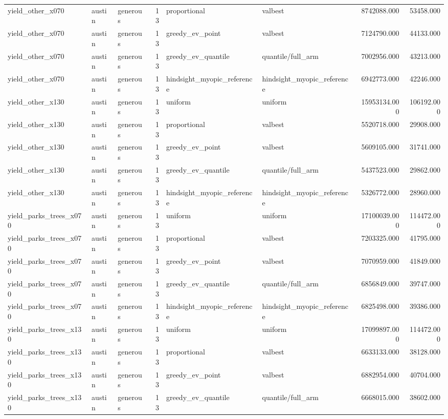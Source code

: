 \begin{tabular}{lllrllrr}
yield\_other\_x070 & austin & generous & 13 & proportional & valbest & 8742088.000 & 53458.000 \\
yield\_other\_x070 & austin & generous & 13 & greedy\_ev\_point & valbest & 7124790.000 & 44133.000 \\
yield\_other\_x070 & austin & generous & 13 & greedy\_ev\_quantile & quantile/full\_arm & 7002956.000 & 43213.000 \\
yield\_other\_x070 & austin & generous & 13 & hindsight\_myopic\_reference & hindsight\_myopic\_reference & 6942773.000 & 42246.000 \\
yield\_other\_x130 & austin & generous & 13 & uniform & uniform & 15953134.000 & 106192.000 \\
yield\_other\_x130 & austin & generous & 13 & proportional & valbest & 5520718.000 & 29908.000 \\
yield\_other\_x130 & austin & generous & 13 & greedy\_ev\_point & valbest & 5609105.000 & 31741.000 \\
yield\_other\_x130 & austin & generous & 13 & greedy\_ev\_quantile & quantile/full\_arm & 5437523.000 & 29862.000 \\
yield\_other\_x130 & austin & generous & 13 & hindsight\_myopic\_reference & hindsight\_myopic\_reference & 5326772.000 & 28960.000 \\
yield\_parks\_trees\_x070 & austin & generous & 13 & uniform & uniform & 17100039.000 & 114472.000 \\
yield\_parks\_trees\_x070 & austin & generous & 13 & proportional & valbest & 7203325.000 & 41795.000 \\
yield\_parks\_trees\_x070 & austin & generous & 13 & greedy\_ev\_point & valbest & 7070959.000 & 41849.000 \\
yield\_parks\_trees\_x070 & austin & generous & 13 & greedy\_ev\_quantile & quantile/full\_arm & 6856849.000 & 39747.000 \\
yield\_parks\_trees\_x070 & austin & generous & 13 & hindsight\_myopic\_reference & hindsight\_myopic\_reference & 6825498.000 & 39386.000 \\
yield\_parks\_trees\_x130 & austin & generous & 13 & uniform & uniform & 17099897.000 & 114472.000 \\
yield\_parks\_trees\_x130 & austin & generous & 13 & proportional & valbest & 6633133.000 & 38128.000 \\
yield\_parks\_trees\_x130 & austin & generous & 13 & greedy\_ev\_point & valbest & 6882954.000 & 40704.000 \\
yield\_parks\_trees\_x130 & austin & generous & 13 & greedy\_ev\_quantile & quantile/full\_arm & 6668015.000 & 38602.000 \\

\end{tabular}
